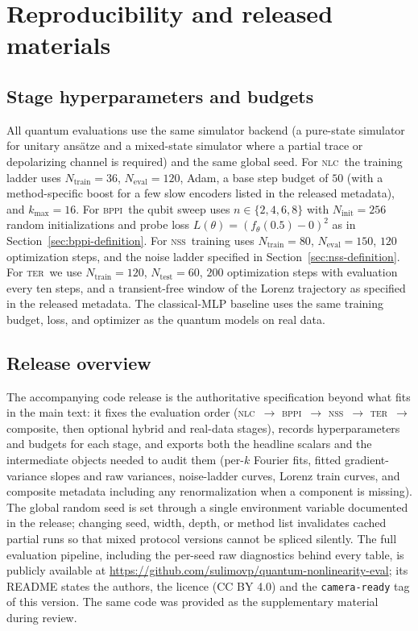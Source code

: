 \documentclass{article}
\newcommand{\nlc}{\textsc{nlc}}
\newcommand{\bppi}{\textsc{bppi}}
\newcommand{\nss}{\textsc{nss}}
\newcommand{\ter}{\textsc{ter}}
\begin{document}
\appendix

\section{Reproducibility and released materials}
\label{app:reproducibility}

\subsection{Stage hyperparameters and budgets}
\label{app:stage-hyperparams}

All quantum evaluations use the same simulator backend (a pure-state simulator for unitary ans\"atze and a mixed-state simulator where a partial trace or depolarizing channel is required) and the same global seed.
For \nlc\ the training ladder uses $N_{\mathrm{train}} = 36$, $N_{\mathrm{eval}} = 120$, Adam, a base step budget of $50$ (with a method-specific boost for a few slow encoders listed in the released metadata), and $k_{\max} = 16$.
For \bppi\ the qubit sweep uses $n \in \{2, 4, 6, 8\}$ with $N_{\mathrm{init}} = 256$ random initializations and probe loss $L(\theta)=(f_\theta(0.5)-0)^2$ as in Section~\ref{sec:bppi-definition}.
For \nss\ training uses $N_{\mathrm{train}} = 80$, $N_{\mathrm{eval}} = 150$, $120$ optimization steps, and the noise ladder specified in Section~\ref{sec:nss-definition}.
For \ter\ we use $N_{\mathrm{train}} = 120$, $N_{\mathrm{test}} = 60$, $200$ optimization steps with evaluation every ten steps, and a transient-free window of the Lorenz trajectory as specified in the released metadata.
The classical-MLP baseline uses the same training budget, loss, and optimizer as the quantum models on real data.

\subsection{Release overview}

The accompanying code release is the authoritative specification beyond what fits in the main text: it fixes the evaluation order (\nlc\ $\to$ \bppi\ $\to$ \nss\ $\to$ \ter\ $\to$ composite, then optional hybrid and real-data stages), records hyperparameters and budgets for each stage, and exports both the headline scalars and the intermediate objects needed to audit them (per-$k$ Fourier fits, fitted gradient-variance slopes and raw variances, noise-ladder curves, Lorenz train curves, and composite metadata including any renormalization when a component is missing).
The global random seed is set through a single environment variable documented in the release; changing seed, width, depth, or method list invalidates cached partial runs so that mixed protocol versions cannot be spliced silently.
The full evaluation pipeline, including the per-seed raw diagnostics behind every table, is publicly available at
\url{https://github.com/sulimovp/quantum-nonlinearity-eval}; its README states the authors, the licence (CC BY 4.0) and the \texttt{camera-ready} tag of this version.
The same code was provided as the supplementary material during review.
\end{document}

